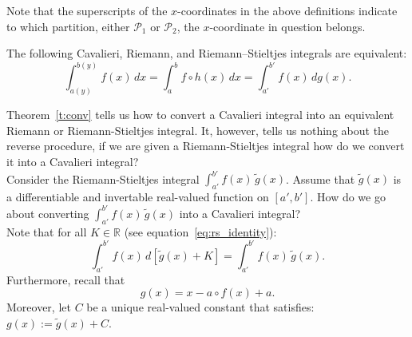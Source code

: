 \documentclass[twoside,reqno,11pt]{fcaa-var} %
\begin{document}
\noindent
Note that the superscripts of the $x$-coordinates in the above definitions indicate to which partition, either $\mathcal{P}_1$ or $\mathcal{P}_2$, the $x$-coordinate in question belongs.

\begin{theorem}
\label{t:conv}
The following Cavalieri, Riemann, and Riemann--Stieltjes integrals are equivalent:
\begin{equation}
\int_{a(y)}^{b(y)} f(x)\,dx = \int_a^b f\circ h(x)\,dx = \int_{a'}^{b'} f(x)\,dg(x).
\end{equation}
\end{theorem}

\noindent
Theorem~\ref{t:conv} tells us how to convert a Cavalieri integral into an equivalent Riemann or Riemann-Stieltjes integral. It, however, tells us nothing about the reverse procedure, if we are given a Riemann-Stieltjes integral how do we convert it into a Cavalieri integral?\\ 

\noindent
Consider the Riemann-Stieltjes integral $\int_{a'}^{b'} f(x)\,\widetilde{g}(x)$. Assume that $\widetilde{g}(x)$ is a differentiable and invertable real-valued function on $[a',b']$. How do we go about converting $\int_{a'}^{b'} f(x)\,\widetilde{g}(x)$ into a Cavalieri integral?\\ 

\noindent
Note that for all $K\in\mathbb{R}$ (see equation~\ref{eq:rs_identity}):
\begin{equation}
\int_{a'}^{b'} f(x)\,d[\widetilde{g}(x)+K] = \int_{a'}^{b'}f(x)\,\widetilde{g}(x). 
\end{equation}
Furthermore, recall that
\begin{equation}
\label{eq:g_definition}
g(x) = x - a\circ f(x) + a.
\end{equation}
Moreover, let $C$ be a unique real-valued constant that satisfies: $g(x) := \widetilde{g}(x)+C$.\\
\end{document}
